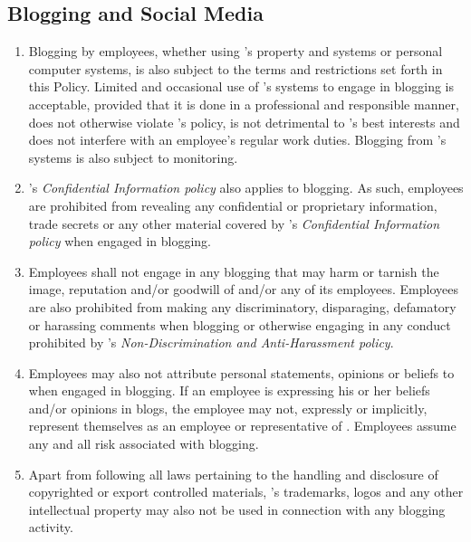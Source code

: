\subsection{Blogging and Social Media}
\begin{enumerate}
\item
Blogging by employees, whether using \CompanyName{}'s property and systems or personal computer systems, is also subject to the terms and restrictions set forth in this Policy.  
Limited and occasional use of \CompanyName{}'s systems to engage in blogging is acceptable, provided that it is done in a professional and responsible manner, does not otherwise violate \CompanyName{}'s policy, is not detrimental to \CompanyName{}'s best interests\oxford{} and does not interfere with an employee's regular work duties.  
Blogging from \CompanyName{}'s systems is also subject to monitoring.
\item
\CompanyName{}'s \textsl{Confidential Information policy} also applies to blogging.  
As such, employees are prohibited from revealing any \CompanyName{} confidential or proprietary information, trade secrets\oxford{} or any other material covered by \CompanyName{}'s \textsl{Confidential Information policy} when engaged in blogging.
\item
Employees shall not engage in any blogging that may harm or tarnish the image, reputation\oxford{} and/or goodwill of \CompanyName{} and/or any of its employees.  
Employees are also prohibited from making any discriminatory, disparaging, defamatory\oxford{} or harassing comments when blogging or otherwise engaging in any conduct prohibited by \CompanyName{}'s \textsl{Non-Discrimination and Anti-Harassment policy}.
\item
Employees may also not attribute personal statements, opinions\oxford{} or beliefs to \CompanyName{} when engaged in blogging.  
If an employee is expressing his or her beliefs and/or opinions in blogs, the employee may not, expressly or implicitly, represent themselves as an employee or representative of \CompanyName{}.  
Employees assume any and all risk associated with blogging.
\item
Apart from following all laws pertaining to the handling and disclosure of copyrighted or export controlled materials, \CompanyName{}'s trademarks, logos\oxford{} and any other \CompanyName{} intellectual property may also not be used in connection with any blogging activity.
\end{enumerate}



